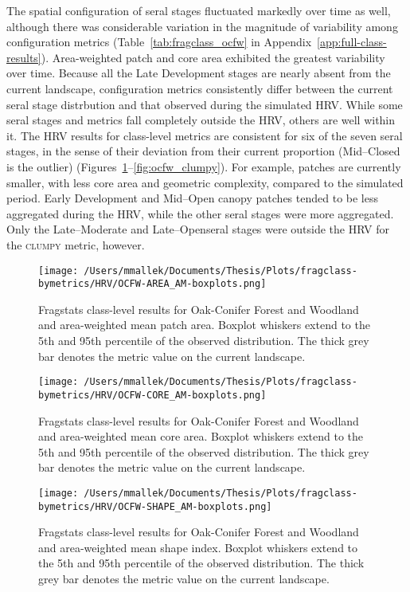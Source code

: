 The spatial configuration of seral stages fluctuated markedly over time as well, although there was considerable variation in the magnitude of variability among configuration metrics (Table~\ref{tab:fragclass_ocfw} in Appendix~\ref{app:full-class-results}). Area-weighted patch and core area exhibited the greatest variability over time. Because all the Late Development stages are nearly absent from the current landscape, configuration metrics consistently differ between the current seral stage distrbution and that observed during the simulated HRV. While some seral stages and metrics fall completely outside the HRV, others are well within it. The HRV results for class-level metrics are consistent for six of the seven seral stages, in the sense of their deviation from their current proportion (Mid--Closed is the outlier) (Figures~\ref{fig:ocfw_areaam}--\ref{fig:ocfw_clumpy}). For example, patches are currently smaller, with less core area and geometric complexity, compared to the simulated period. Early Development and Mid--Open canopy patches tended to be less aggregated during the HRV, while the other seral stages were more aggregated. Only the Late--Moderate and Late--Openseral stages were outside the HRV for the \textsc{clumpy} metric, however.


\begin{figure}[!htbp]
\centering
    \texttt{[image: /Users/mmallek/Documents/Thesis/Plots/fragclass-bymetrics/HRV/OCFW-AREA\_AM-boxplots.png]}
  \caption{Fragstats class-level results for Oak-Conifer Forest and Woodland and area-weighted mean patch area. Boxplot whiskers extend to the 5th and 95th percentile of the observed distribution. The thick grey bar denotes the metric value on the current landscape.}
  \label{fig:ocfw_areaam}
\end{figure}


\begin{figure}[!htbp]
\centering
    \texttt{[image: /Users/mmallek/Documents/Thesis/Plots/fragclass-bymetrics/HRV/OCFW-CORE\_AM-boxplots.png]}
  \caption{Fragstats class-level results for Oak-Conifer Forest and Woodland and area-weighted mean core area. Boxplot whiskers extend to the 5th and 95th percentile of the observed distribution. The thick grey bar denotes the metric value on the current landscape.}
  \label{fig:ocfw_coream}
\end{figure}


\begin{figure}[!htbp]
\centering
    \texttt{[image: /Users/mmallek/Documents/Thesis/Plots/fragclass-bymetrics/HRV/OCFW-SHAPE\_AM-boxplots.png]}
  \caption{Fragstats class-level results for Oak-Conifer Forest and Woodland and area-weighted mean shape index. Boxplot whiskers extend to the 5th and 95th percentile of the observed distribution. The thick grey bar denotes the metric value on the current landscape.}
  \label{fig:ocfw_shapeam}
\end{figure}


